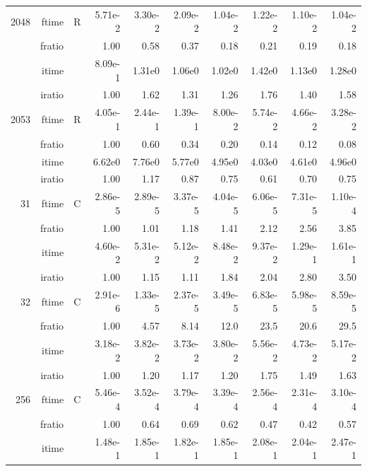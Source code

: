 \documentclass[a4paper]{article}
\begin{document}
\begin{table}
\begin{center}
\begin{tabular}{|r|r|r|r|r|r|r|r|r|r|}
  2048  & ftime & R  &  5.71e-2 &   3.30e-2 &   2.09e-2 &   1.04e-2 &   1.22e-2 &   1.10e-2 &   1.04e-2   \\ 
      & fratio & &      1.00 &   0.58 &   0.37 &   0.18 &   0.21 &   0.19 &   0.18     \\ 
     & itime & &        8.09e-1 &   1.31e0 &   1.06e0 &   1.02e0 &   1.42e0 &   1.13e0 &   1.28e0     \\ 
     & iratio & &       1.00 &   1.62 &   1.31 &   1.26 &   1.76 &   1.40 &   1.58      \\ \hline 
  2053  & ftime & R  &  4.05e-1 &   2.44e-1 &   1.39e-1 &   8.00e-2 &   5.74e-2 &   4.66e-2 &   3.28e-2   \\ 
      & fratio & &      1.00 &   0.60 &   0.34 &   0.20 &   0.14 &   0.12 &   0.08    \\ 
     & itime & &        6.62e0 &   7.76e0 &   5.77e0 &   4.95e0 &   4.03e0 &   4.61e0 &   4.96e0     \\ 
     & iratio & &       1.00 &   1.17 &   0.87 &   0.75 &   0.61 &   0.70 &   0.75      \\ \hline \hline
    31  & ftime & C  &  2.86e-5 &   2.89e-5 &   3.37e-5 &   4.04e-5 &   6.06e-5 &   7.31e-5 &   1.10e-4   \\ 
      & fratio & &      1.00 &   1.01 &   1.18 &   1.41 &   2.12 &   2.56 &   3.85     \\ 
     & itime & &        4.60e-2 &   5.31e-2 &   5.12e-2 &   8.48e-2 &   9.37e-2 &   1.29e-1 &   1.61e-1     \\ 
     & iratio & &       1.00 &   1.15 &   1.11 &   1.84 &   2.04 &   2.80 &   3.50      \\ \hline 
    32  & ftime & C  &  2.91e-6 &   1.33e-5 &   2.37e-5 &   3.49e-5 &   6.83e-5 &   5.98e-5 &   8.59e-5   \\ 
      & fratio & &      1.00 &   4.57 &   8.14 &   12.0 &   23.5 &   20.6 &   29.5     \\ 
     & itime & &        3.18e-2 &   3.82e-2 &   3.73e-2 &   3.80e-2 &   5.56e-2 &   4.73e-2 &   5.17e-2     \\ 
     & iratio & &       1.00 &   1.20 &   1.17 &   1.20 &   1.75 &   1.49 &   1.63      \\ \hline 
   256  & ftime & C  &  5.46e-4 &   3.52e-4 &   3.79e-4 &   3.39e-4 &   2.56e-4 &   2.31e-4 &   3.10e-4   \\ 
      & fratio & &      1.00 &   0.64 &   0.69 &   0.62 &   0.47 &   0.42 &   0.57     \\ 
     & itime & &        1.48e-1 &   1.85e-1 &   1.82e-1 &   1.85e-1 &   2.08e-1 &   2.04e-1 &   2.47e-1     \\ 

\end{tabular}
\end{center}
\end{table}
\end{document}
